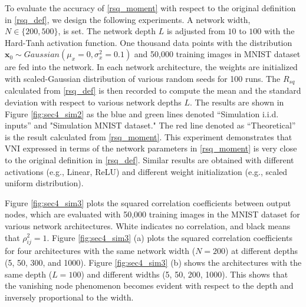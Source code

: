 To evaluate the accuracy of \eqref{rsq_moment} with respect to the original definition in \eqref{rsq_def}, we design the following experiments. A network width, $N\in\{200, 500\}$, is set. The network depth $L$ is adjusted from $10$ to $100$ with the Hard-Tanh activation function.
One thousand data points with the distribution $\mathbf{x}_0\sim Gaussian(\mu_x=0, \sigma^2_x=0.1)$ and 50,000 training images in MNIST dataset \cite{mnist} are fed into the network.
In each network architecture, the weights are initialized with scaled-Gaussian distribution \cite{xavier} of various random seeds for 100 runs.
The $R_{sq}$ calculated from \eqref{rsq_def} is then recorded to compute the mean and the standard deviation with respect to various network depths $L$.
The results are shown in Figure \ref{fig:sec4_sim2} as the blue and green lines denoted “Simulation i.i.d. inputs” and "Simulation MNIST dataset." The red line denoted as “Theoretical” is the result calculated from \eqref{rsq_moment}. This experiment demonstrates that VNI expressed in terms of the network parameters in \eqref{rsq_moment} is very close to the original definition in \eqref{rsq_def}.
Similar results are obtained with different activations (e.g., Linear, ReLU) and different weight initialization (e.g., scaled uniform distribution).

Figure \ref{fig:sec4_sim3} plots the squared correlation coefficients between output nodes, which are evaluated with 50,000 training images in the MNIST dataset \cite{mnist} for various network architectures. White indicates no correlation, and black means that $\rho_{ij}^2 = 1$. Figure \ref{fig:sec4_sim3} (a) plots the squared correlation coefficients for four architectures with the same network width ($N=200$) at different depths (5, 50, 300, and 1000). Figure \ref{fig:sec4_sim3} (b) shows the architectures with the same depth ($L=100$) and different widths (5, 50, 200, 1000).  
This shows that the vanishing node phenomenon becomes evident with respect to the depth and inversely proportional to the width.


